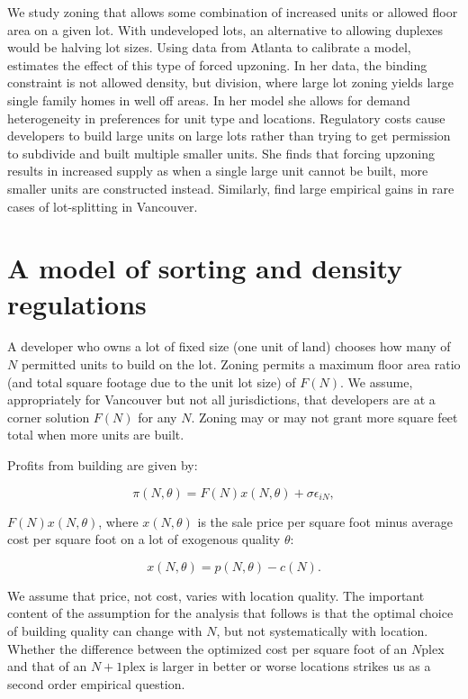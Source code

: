 \documentclass[12pt]{article}
\begin{document}
We study zoning that allows some combination of increased units or allowed floor area on a given lot. With undeveloped lots, an alternative to allowing duplexes would be halving lot sizes. Using data from Atlanta to calibrate a model, \textcite{Ma_2025} estimates the effect of this type of forced upzoning. In her data, the binding constraint is not allowed density, but division, where large lot zoning yields large single family homes in well off areas. In her model she allows for demand heterogeneity in preferences for unit type and locations. Regulatory costs cause developers to build large units on large lots rather than trying to get permission to subdivide and built multiple smaller units. She finds that forcing upzoning results in increased supply as when a single large unit cannot be built, more smaller units are constructed instead. Similarly, \textcite{vonBergmannLauster} find large empirical gains in rare cases of lot-splitting in Vancouver.

\section{\label{sec:model} A model of sorting and density regulations}

A developer who owns a lot of fixed size (one unit of land) chooses how
many of $N$ permitted units to build on the lot. Zoning permits a maximum floor
area ratio (and total square footage due to the unit lot size) of $F(N)$. We
assume, appropriately for Vancouver but not all jurisdictions, that developers
are at a corner solution $F(N)$ for any $N$. Zoning may or may not grant more
square feet total when more units are built. 

Profits from building are given by:

\begin{equation}
	\label{eq:profit}
	\pi\left(N,\theta\right) = F(N)x\left(N,\theta\right) + \sigma\epsilon_{iN},
\end{equation}

$F(N)x\left(N,\theta\right)$, where $x(N,\theta)$ is the sale price per square foot
minus average cost per square foot on a lot of exogenous quality $\theta$:

\begin{equation}
	\label{eq:x}
	x(N,\theta) = p(N,\theta) - c(N).
\end{equation}

We assume that price, not cost, varies with location quality. The important
content of the assumption for the analysis that follows is that the optimal
choice of building quality can change with $N$, but not systematically with
location. Whether the difference between the optimized cost per square foot of
an $N$plex and that of an $N+1$plex is larger in better or worse locations
strikes us as a second order empirical question.
\end{document}

